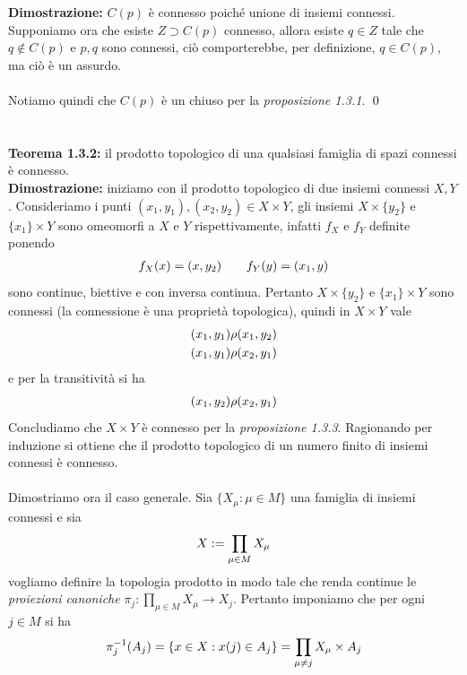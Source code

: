 \documentclass{article}
\begin{document}
\textbf{Dimostrazione:} $C(p)$ è connesso poiché unione di insiemi connessi. Supponiamo ora che esiste $Z \supset C(p)$ connesso, allora esiste $q \in Z$ tale che $q \not\in C(p)$ e $p, q$ sono connessi, ciò comporterebbe, per definizione, $q \in C(p)$, ma ciò è un assurdo. \\ \\ Notiamo quindi che $C(p)$ è un chiuso per la \textit{proposizione 1.3.1}. \qed \\ \\ \\
\textbf{Teorema 1.3.2:} il prodotto topologico di una qualsiasi famiglia di spazi connessi è connesso. \\

\textbf{Dimostrazione:} iniziamo con il prodotto topologico di due insiemi connessi $X, Y$. Consideriamo i punti $(x_1, y_1), (x_2, y_2) \in X \times Y$, gli insiemi $X \times \{ y_2 \}$ e $\{ x_1 \} \times Y$ sono omeomorfi a $X$ e $Y$ rispettivamente, infatti $f_X$ e $f_Y$ definite ponendo
\begin{gather}
    f_X(x) = (x, y_2) \qquad f_Y(y) = (x_1, y) \notag
\end{gather}
sono continue, biettive e con inversa continua. Pertanto $X \times \{ y_2 \}$ e $\{ x_1 \} \times Y$ sono connessi (la connessione è una proprietà topologica), quindi in $X \times Y$ vale
\begin{gather}
    (x_1, y_1) \rho (x_1, y_2) \notag \\
    (x_1, y_1) \rho (x_2, y_1) \notag
\end{gather}
e per la transitività si ha
\begin{gather}
    (x_1, y_2) \rho (x_2, y_1) \notag
\end{gather}
Concludiamo che $X \times Y$ è connesso per la \textit{proposizione 1.3.3}. Ragionando per induzione si ottiene che il prodotto topologico di un numero finito di insiemi connessi è connesso. \\ \\
Dimostriamo ora il caso generale. Sia $\{ X_\mu : \mu \in M \}$ una famiglia di insiemi connessi e sia 
\begin{gather}
    X := \prod_{\mu \in M} X_\mu \notag
\end{gather}
vogliamo definire la topologia prodotto in modo tale che renda continue le \textit{proiezioni canoniche} $\pi_j : \prod_{\mu \in M} X_\mu \longrightarrow X_j$. Pertanto imponiamo che per ogni $j \in M$ si ha
\begin{gather}
    \pi_j^{-1}(A_j) = \{ x \in X : x(j) \in A_j \} = \prod_{\mu \neq j} X_\mu \times A_j \notag
\end{gather}
\end{document}

